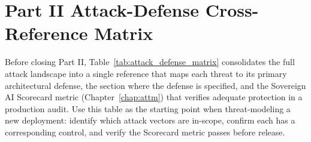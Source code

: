 \section{Part II Attack-Defense Cross-Reference Matrix}
\label{sec:attack_defense_matrix}

Before closing Part II, Table~\ref{tab:attack_defense_matrix} consolidates the full attack landscape into a single reference that maps each threat to its primary architectural defense, the section where the defense is specified, and the Sovereign AI Scorecard metric (Chapter~\ref{chap:attm}) that verifies adequate protection in a production audit. Use this table as the starting point when threat-modeling a new deployment: identify which attack vectors are in-scope, confirm each has a corresponding control, and verify the Scorecard metric passes before release.


